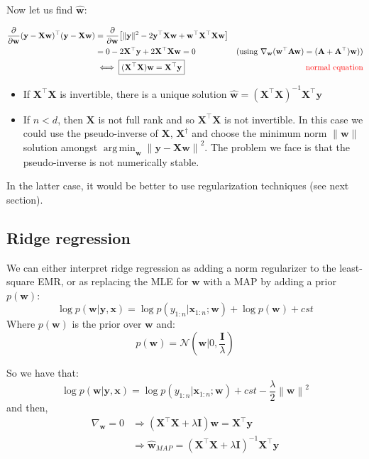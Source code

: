 \documentclass[12pt]{report}
\newcommand{\defobj}[1]{\color{red}#1\color{black}{}}
\renewcommand{\emph}[1]{\color{violet}#1\color{black}{}}
\DeclareMathOperator*{\argmin}{arg\,min}
\newcommand{\norm}[1]{\left \lVert #1 \right\rVert}
\def\XX{\mathbf{X}}
\def\wb{\mathbf{w}}
\def\xb{\mathbf{x}}
\def\yb{\mathbf{y}}
\def\ts{\top}
\newcommand{\normal}{\mathcal{N}}
\begin{document}
Now let us find $\hat{\wb}$:

\begin{align*}
    \frac{\partial}{\partial \wb} (\yb - \XX\wb)^{\ts}(\yb - \XX\wb) &=
    \frac{\partial}{\partial \wb} \big[ \lVert \yb \rVert^2 - 2\yb^{\ts} \XX \wb + \wb^{\ts}\XX^{\ts}\XX\wb \big]
    \\
    &= 0 - 2 \XX^{\ts}\yb + 2\XX^{\ts}\XX\wb = 0 &\text{(using $\nabla_{\wb}(\wb^{\ts}\mathbf{A}\wb) = (\mathbf{A}+\mathbf{A}^{\ts})\wb)$)}
    \\
    &\iff \boxed{(\XX^{\ts}\XX)\wb = \XX^{\ts}\yb} &\text{\defobj{normal equation}}
\end{align*}

\begin{itemize}
    \item
    If $\XX^{\ts}\XX$ is invertible, there is a unique solution $\hat{\wb} = (\XX^{\ts}\XX)^{-1}\XX^{\ts}\yb$
    \item
    If $n<d$, then $\XX$ is not \emph{full rank} and so $\XX^{\ts}\XX$ is \emph{not invertible}. In this case we could use the pseudo-inverse of $\XX$, $\XX^{\dagger}$
    and choose the minimum norm $\lVert \wb \rVert$ solution amongst $\argmin_{\wb} {\lVert \yb - \XX\wb \rVert}^2$. The problem we face is that the pseudo-inverse
    is \emph{not numerically stable}.
\end{itemize}

In the latter case, it would be better to use regularization techniques (see next section).

\subsection{Ridge regression}
We can either interpret ridge regression as adding a norm regularizer to the least-square EMR, or as replacing the MLE for $\wb$ with a MAP by adding a prior $p(\wb)$:
$$\log p(\wb|\yb, \xb) = \log p(y_{1:n} | \xb_{1:n} ; \wb) + \log p(\wb) + cst$$
Where $p(\wb)$ is the prior over $\wb$ and:
$$ p(\wb) = \normal(\wb|0, \frac{\mathbf{I}}{\lambda}) $$

So we have that:
$$\log p(\wb|\yb, \xb) = \log p(y_{1:n} | \xb_{1:n} ; \wb) + cst - \frac{\lambda}{2} \norm{\wb}^2 $$
and then,
\begin{align*}
    \nabla_{\wb} = 0 &\Rightarrow (\XX^{\ts}\XX + \lambda \mathbf{I})\wb = \XX^{\ts}\yb
    \\
    &\Rightarrow \hat{\wb}_{MAP} = (\XX^{\ts}\XX + \lambda \mathbf{I})^{-1}\XX^{\ts}\yb
\end{align*}
\end{document}
